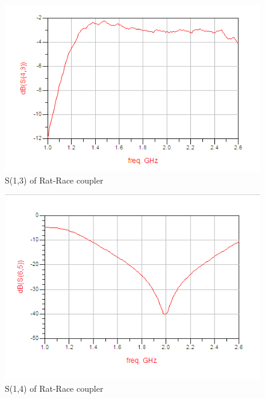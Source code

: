 \documentclass[11pt,a4paper]{report}
\begin{document}
\begin{figure}
\centering
\includegraphics[width=1.5\textwidth]{S13.png}
\caption{S(1,3) of Rat-Race coupler}
\end{figure}

\begin{figure}
\centering
\includegraphics[width=1.5\textwidth]{S14.png}
\caption{S(1,4) of Rat-Race coupler}
\end{figure}
\end{document}
